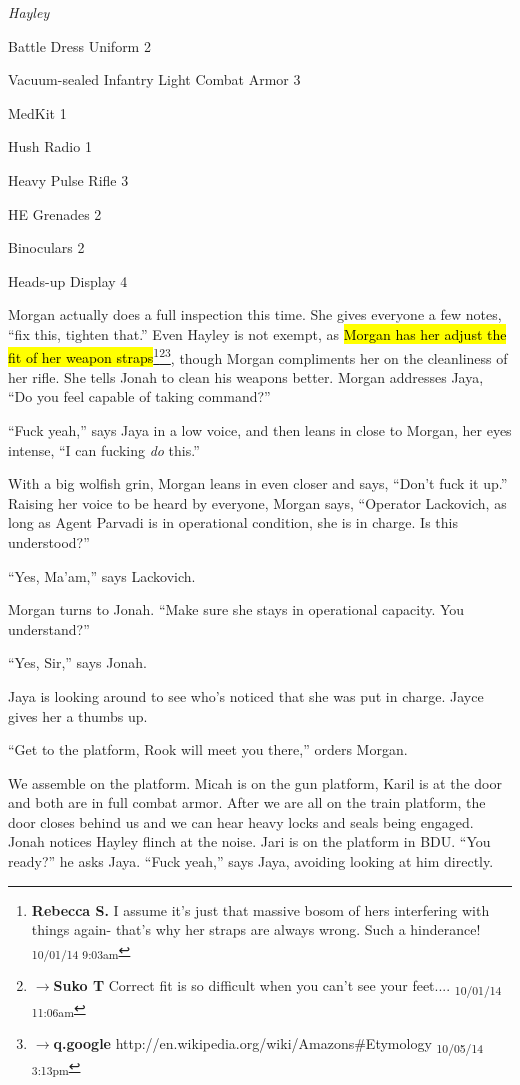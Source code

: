 \textit{Hayley}

{\parskip=0pt
Battle Dress Uniform 2

Vacuum-sealed Infantry Light Combat Armor 3

MedKit 1

Hush Radio 1

Heavy Pulse Rifle 3

HE Grenades 2

Binoculars 2

Heads-up Display 4
}


Morgan actually does a full inspection this time.  She gives everyone a few notes, ``fix this, tighten that.'' Even Hayley is not exempt, as \hl{Morgan has her adjust the fit of her weapon straps}\footnote{\textbf{Rebecca S. }I assume it's just that massive bosom of hers interfering with things again- that's why her straps are always wrong. Such a hinderance! \textsubscript{10/01/14 9:03am}}\footnote{$\rightarrow$\textbf{Suko T }Correct fit is so difficult when you can't see your feet.... \textsubscript{10/01/14 11:06am}}\footnote{$\rightarrow$\textbf{q.google }http://en.wikipedia.org/wiki/Amazons\#Etymology \textsubscript{10/05/14 3:13pm}}, though Morgan compliments her on the cleanliness of her rifle.  She tells Jonah to clean his weapons better.   Morgan addresses Jaya, ``Do you feel capable of taking command?''

``Fuck yeah,'' says Jaya in a low voice, and then leans in close to Morgan, her eyes intense, ``I can fucking \textit{do} this.''

With a big wolfish grin, Morgan leans in even closer and says, ``Don't fuck it up.''  Raising her voice to be heard by everyone, Morgan says, ``Operator Lackovich, as long as Agent Parvadi is in operational condition, she is in charge. Is this understood?''

``Yes, Ma'am,'' says Lackovich.

Morgan turns to Jonah.  ``Make sure she stays in operational capacity.  You understand?''

``Yes, Sir,'' says Jonah.

Jaya is looking around to see who's noticed that she was put in charge.  Jayce gives her a thumbs up.

``Get to the platform, Rook will meet you there,'' orders Morgan.



We assemble on the platform.  Micah is on the gun platform, Karil is at the door and both are in full combat armor.  After we are all on the train platform, the door closes behind us and we can hear heavy locks and seals being engaged. Jonah notices Hayley flinch at the noise.  Jari is on the platform in BDU.  ``You ready?'' he asks Jaya.  ``Fuck yeah,'' says Jaya, avoiding looking at him directly.

